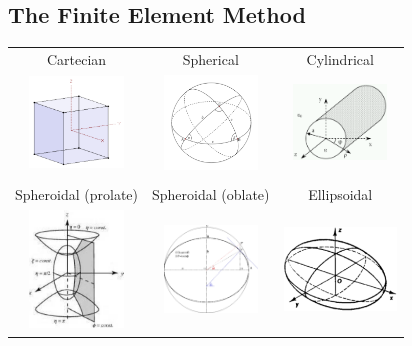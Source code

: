 \documentclass[handout]{beamer}
{
\usepackage{fullpage}
\usepackage{hyperref}
\usepackage{amssymb} 
}
\begin{document}
\begin{frame}
\section{The Finite Element Method}
\centering
\scriptsize{
    \begin{tabular}{ccc} 
    Cartecian & Spherical & Cylindrical \\
    \includegraphics[width=2.5cm]{figures/cubic.pdf}       &
    \includegraphics[width=2.5cm]{figures/spherical.pdf}   &
    \includegraphics[width=2.5cm]{figures/cylindrical.pdf} 
    \\
    \\
    Spheroidal (prolate) & Spheroidal (oblate) & Ellipsoidal \\
    \includegraphics[width=2.5cm]{figures/prolate.pdf}     &
    \includegraphics[width=2.5cm]{figures/oblate.pdf}      &
    \includegraphics[width=3cm]{figures/ellipsoid.pdf}
\end{tabular}
}
\end{frame}
\end{document}
